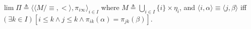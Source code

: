 $\lim \Pi \triangleq \langle \langle M / \equiv, < \rangle, \pi_{i\infty} \rangle_{i \in I}$ where $M \triangleq \bigcup_{i \in I} \{i\} \times \eta_i$, and
$\langle i, \alpha \rangle \equiv \langle j, \beta \rangle$ iff $(\exists k \in I)[i \leq k \land j \leq k \land \pi_{ik}(\alpha) = \pi_{jk}(\beta)]$.
